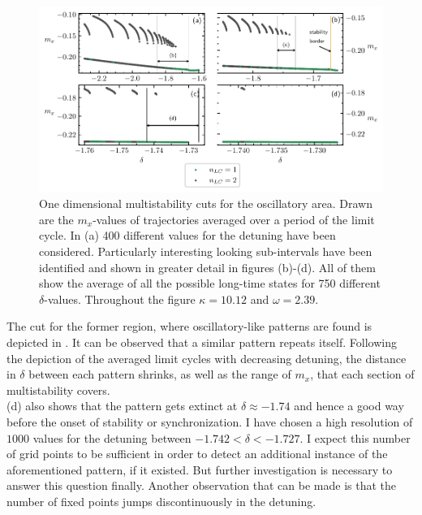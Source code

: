 \begin{figure}[H]
    \hspace*{-1.2cm}
    \includegraphics{pictures/multistab_line.pdf}
    \caption{One dimensional multistability cuts for the oscillatory area. Drawn are the $m_x$-values of trajectories averaged over a period of the limit cycle. In (a) 400 different values for the detuning have been considered. Particularly interesting looking sub-intervals have been identified and shown in greater detail in figures (b)-(d). All of them show the average of all the possible long-time states for 750 different $\delta$-values. Throughout the figure $\kappa=10.12$ and $\omega=2.39$.}
    \label{fig:osci_cut}
\end{figure}
The cut for the former region, where oscillatory-like patterns are found is depicted in . It can be observed that a similar pattern repeats itself. Following the depiction of the averaged limit cycles with decreasing detuning, the distance in $\delta$ between each pattern shrinks, as well as the range of $m_x$, that each section of multistability covers. \\(d) also shows that the pattern gets extinct at $\delta\approx-1.74$ and hence a good way before the onset of stability or synchronization. I have chosen a high resolution of $1000$ values for the detuning between $-1.742<\delta<-1.727$. I expect this number of grid points to be sufficient in order to detect an additional instance of the aforementioned pattern, if it existed. But further investigation is necessary to answer this question finally. Another observation that can be made is that the number of fixed points jumps discontinuously in the detuning.\\\\
